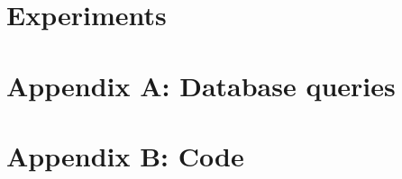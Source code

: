 \documentclass[12pt]{article}
\begin{document}
\section{Experiments}
\label{sec:experiments}


\section{Appendix A: Database queries}
\label{sec:database_queries}


\section{Appendix B: Code}
\label{sec:code}


% 



\end{document}
